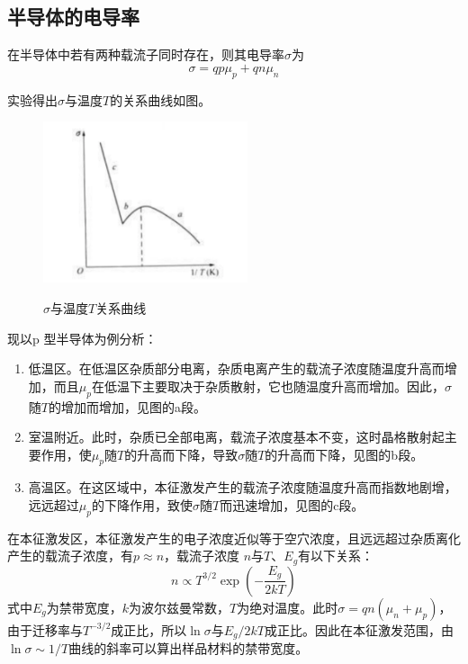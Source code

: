 \documentclass[a4paper]{article}
\begin{document}
\subsection{半导体的电导率}
在半导体中若有两种载流子同时存在，则其电导率$\sigma$为
\begin{equation}\label{6.1.15}
\sigma=qp\mu_p+qn\mu_n
\end{equation}

实验得出$\sigma$与温度$T$的关系曲线如图。
\begin{figure}[!h]
	\centering
	\includegraphics[width=6cm]{fig/fig3.png}\\
	\caption{$\sigma$与温度$T$关系曲线}\label{fig3}
\end{figure}

现以p 型半导体为例分析：
\begin{enumerate}
\item 低温区。在低温区杂质部分电离，杂质电离产生的载流子浓度随温度升高而增加，而且$\mu_p$在低温下主要取决于杂质散射，它也随温度升高而增加。因此，$\sigma$随$T$的增加而增加，见图的a段。
\item 室温附近。此时，杂质已全部电离，载流子浓度基本不变，这时晶格散射起主要作用，使$\mu_p$随$T$的升高而下降，导致$\sigma$随$T$的升高而下降，见图的b段。
\item 高温区。在这区域中，本征激发产生的载流子浓度随温度升高而指数地剧增，远远超过$\mu_p$的下降作用，致使$\sigma$随$T$而迅速增加，见图的c段。
\end{enumerate}

在本征激发区，本征激发产生的电子浓度近似等于空穴浓度，且远远超过杂质离化产生的载流子浓度，有$p\approx n$，载流子浓度 $n$与$T$、$E_g$有以下关系：
\begin{equation*}
n\propto T^{3/2} \exp(-\frac{E_g}{2kT})
\end{equation*}
式中$E_g$为禁带宽度，$k$为波尔兹曼常数，$T$为绝对温度。此时$\sigma=qn(\mu_n+\mu_p)$，由于迁移率与$T^{-3/2}$成正比，所以$\ln\sigma$与$E_g/2kT$成正比。因此在本征激发范围，由$\ln\sigma \sim 1/T$曲线的斜率可以算出样品材料的禁带宽度。
\end{document}
